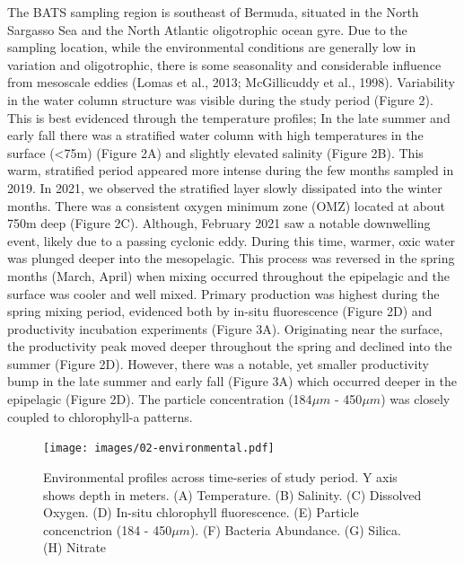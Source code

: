 \documentclass[
]{article}
\begin{document}
The BATS sampling region is southeast of Bermuda, situated in the North
Sargasso Sea and the North Atlantic oligotrophic ocean gyre. Due to the
sampling location, while the environmental conditions are generally low
in variation and oligotrophic, there is some seasonality and
considerable influence from mesoscale eddies (Lomas et al., 2013;
McGillicuddy et al., 1998). Variability in the water column structure
was visible during the study period (Figure 2). This is best evidenced
through the temperature profiles; In the late summer and early fall
there was a stratified water column with high temperatures in the
surface (\textless75m) (Figure 2A) and slightly elevated salinity
(Figure 2B). This warm, stratified period appeared more intense during
the few months sampled in 2019. In 2021, we observed the stratified
layer slowly dissipated into the winter months. There was a consistent
oxygen minimum zone (OMZ) located at about 750m deep (Figure 2C).
Although, February 2021 saw a notable downwelling event, likely due to a
passing cyclonic eddy. During this time, warmer, oxic water was plunged
deeper into the mesopelagic. This process was reversed in the spring
months (March, April) when mixing occurred throughout the epipelagic and
the surface was cooler and well mixed. Primary production was highest
during the spring mixing period, evidenced both by in-situ fluorescence
(Figure 2D) and productivity incubation experiments (Figure 3A).
Originating near the surface, the productivity peak moved deeper
throughout the spring and declined into the summer (Figure 2D). However,
there was a notable, yet smaller productivity bump in the late summer
and early fall (Figure 3A) which occurred deeper in the epipelagic
(Figure 2D). The particle concentration (184\(\mu m\) - 450\(\mu m\))
was closely coupled to chlorophyll-a patterns.

\begin{figure}

{\centering \texttt{[image: images/02-environmental.pdf]}

}

\caption{Environmental profiles across time-series of study period. Y
axis shows depth in meters. (A) Temperature. (B) Salinity. (C) Dissolved
Oxygen. (D) In-situ chlorophyll fluorescence. (E) Particle concenctrion
(184 - 450\(\mu m\)). (F) Bacteria Abundance. (G) Silica. (H) Nitrate}

\end{figure}
\end{document}
